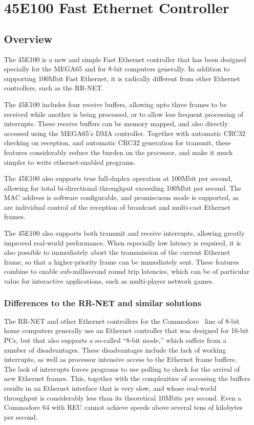 \chapter{45E100 Fast Ethernet Controller}

\section{Overview}

The 45E100 is a new and simple Fast Ethernet controller that has been
designed specially for the MEGA65 and for 8-bit computers generally.
In addition to supporting 100Mbit Fast Ethernet, it is radically
different from other Ethernet controllers, such as the RR-NET.

The 45E100 includes four receive buffers, allowing upto three frames to be
received while another is being processed, or to allow less frequent processing of interrupts.
These receive buffers can be memory mapped, and also directly accessed using the MEGA65's DMA controller.
Together with automatic CRC32 checking on reception, and automatic CRC32 generation for transmit, these features considerably
reduce the burden on the processor, and make it much simpler to write ethernet-enabled programs.

The 45E100 also supports true
full-duplex operation at 100Mbit per second, allowing for total bi-directional
throughput exceeding 100Mbit per second.  The MAC address is software
configurable, and promiscuous mode is supported, as are individual control
of the reception of broadcast and multi-cast Ethernet frames.

The 45E100 also
supports both transmit and receive interrupts, allowing greatly improved
real-world performance. When especially low latency is required, it is also possible
to immediately abort the transmission of the current Ethernet frame, so that a
higher-priority frame can be immediately sent.
These features combine to enable sub-millisecond round trip latencies,
which can be of particular value for interactive applications, such as multi-player network
games.

\subsection{Differences to the RR-NET and similar solutions}

The RR-NET and other Ethernet controllers for the Commodore\texttrademark{} \ line
of 8-bit home computers generally use an Ethernet controller that was
designed for 16-bit PCs, but that also supports a so-called ``8-bit mode,''
which suffers from a number of disadvantages. These disadvantages
include the lack of working interrupts, as well as processor intensive access to
the Ethernet frame buffers.  The lack of interrupts forces programs to
use polling to check for the arrival of new Ethernet frames.  This,
together with the complexities of accessing the buffers results in an
Ethernet interface that is very slow, and whose real-world throughput
is considerably less than its theoretical 10Mbits per second.  Even
a Commodore 64 with REU cannot achieve speeds above several tens of
kilobytes per second.

